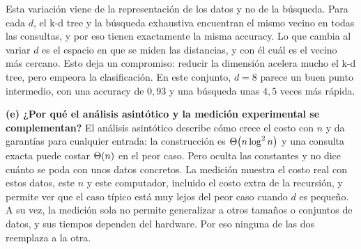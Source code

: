 Esta variación viene de la representación de los datos y no de la búsqueda. Para cada $d$,
el k-d tree y la búsqueda exhaustiva encuentran el mismo vecino en todas las consultas, y
por eso tienen exactamente la misma accuracy. Lo que cambia al variar $d$ es el espacio en
que se miden las distancias, y con él cuál es el vecino más cercano. Esto deja un
compromiso: reducir la dimensión acelera mucho el k-d tree, pero empeora la
clasificación. En este conjunto, $d = 8$ parece un buen punto intermedio, con una accuracy
de $0{,}93$ y una búsqueda unas $4{,}5$ veces más rápida.

\textbf{(e) ¿Por qué el análisis asintótico y la medición experimental se complementan?}
El análisis asintótico describe cómo crece el costo con $n$ y da garantías para cualquier
entrada: la construcción es $\Theta\!\left(n\log^2 n\right)$ y una consulta exacta puede costar $\Theta\!\left(n\right)$ en
el peor caso. Pero oculta las constantes y no dice cuánto se poda con unos datos
concretos. La medición muestra el costo real con estos datos, este $n$ y este computador,
incluido el costo extra de la recursión, y permite ver que el caso típico está muy lejos
del peor caso cuando $d$ es pequeño. A su vez, la medición sola no permite generalizar a
otros tamaños o conjuntos de datos, y sus tiempos dependen del hardware. Por eso ninguna
de las dos reemplaza a la otra.

